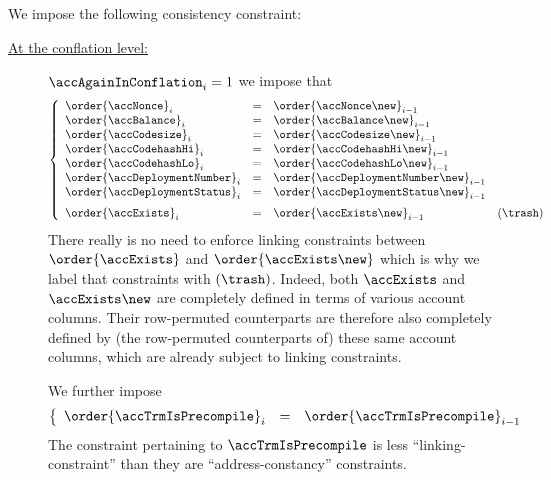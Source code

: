 We impose the following consistency constraint:
\begin{description}
	\item[\underline{At the conflation level:}]
		\If $\accAgainInConflation_{i} = 1$
		\Then we impose that
		\[
			\left\{ \begin{array}{lclr}
				\order{\accNonce            } _{i} & = & \order{\accNonce            \new } _{i - 1}              \\
				\order{\accBalance          } _{i} & = & \order{\accBalance          \new } _{i - 1}              \\
				\order{\accCodesize         } _{i} & = & \order{\accCodesize         \new } _{i - 1}              \\
				\order{\accCodehashHi       } _{i} & = & \order{\accCodehashHi       \new } _{i - 1}              \\
				\order{\accCodehashLo       } _{i} & = & \order{\accCodehashLo       \new } _{i - 1}              \\
				\order{\accDeploymentNumber } _{i} & = & \order{\accDeploymentNumber \new } _{i - 1}              \\
				\order{\accDeploymentStatus } _{i} & = & \order{\accDeploymentStatus \new } _{i - 1} \vspace{2mm} \\
				\order{\accExists           } _{i} & = & \order{\accExists           \new } _{i - 1}               & (\trash) \\
			\end{array} \right.
		\]
		\saNote{}
		There really is no need to enforce linking constraints between $\order{\accExists}$ and $\order{\accExists \new}$
		which is why we label that constraints with $(\trash)$.
		Indeed, both $\accExists$ and $\accExists \new$ are completely defined in terms of various account columns.
		Their row-permuted counterparts are therefore also completely defined by (the row-permuted counterparts of) these same account columns,
		which are already subject to linking constraints.

		We further impose
		\[
			\left\{ \begin{array}{lclr}
				\order{\accTrmIsPrecompile}_{i}   & = & \order{\accTrmIsPrecompile} _{i - 1} \\
			\end{array} \right.
		\]
		\saNote{}
		The constraint pertaining to $\accTrmIsPrecompile$ is less ``linking-constraint''
		than they are ``address-constancy'' constraints.


\end{description}
